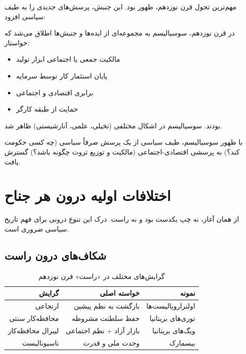 مهم‌ترین تحول قرن نوزدهم، ظهور  بود. این جنبش، پرسش‌های جدیدی را به طیف سیاسی افزود:

\begin{defbox}
در قرن نوزدهم، سوسیالیسم به مجموعه‌ای از ایده‌ها و جنبش‌ها اطلاق می‌شد که خواستار:
\begin{itemize}[nosep]
    \item مالکیت جمعی یا اجتماعی ابزار تولید
    \item پایان استثمار کار توسط سرمایه
    \item برابری اقتصادی و اجتماعی
    \item حمایت از طبقه کارگر
\end{itemize}
بودند. سوسیالیسم در اشکال مختلفی (تخیلی، علمی، آنارشیستی) ظاهر شد.
\end{defbox}

با ظهور سوسیالیسم، طیف سیاسی از یک پرسش صرفاً سیاسی (چه کسی حکومت کند؟) به پرسشی اقتصادی-اجتماعی (مالکیت و توزیع ثروت چگونه باشد؟) گسترش یافت.

\section{اختلافات اولیه درون هر جناح}

از همان آغاز، نه چپ یکدست بود و نه راست. درک این تنوع درونی برای فهم تاریخ سیاسی ضروری است.

\subsection{شکاف‌های درون راست}

\begin{table}[htbp]
\centering
\caption{گرایش‌های مختلف در «راست» قرن نوزدهم}
\label{tab:right-factions}
\begin{tabular}{r|r|r}
\toprule
\textbf{گرایش} & \textbf{خواسته اصلی} & \textbf{نمونه} \\
\midrule
ارتجاعی & بازگشت به نظم پیشین & اولترارویالیست‌ها \\
محافظه‌کار سنتی & حفظ سلطنت مشروطه & توری‌های بریتانیا \\
لیبرال محافظه‌کار & بازار آزاد + نظم اجتماعی & ویگ‌های بریتانیا \\
ناسیونالیست & وحدت ملی و قدرت & بیسمارک \\
\bottomrule
\end{tabular}
\end{table}

